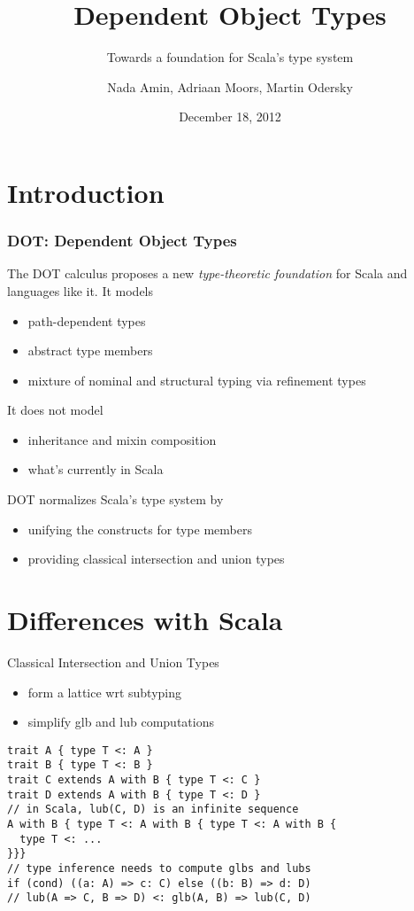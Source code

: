 \documentclass{beamer}
\title{Dependent Object Types}
\subtitle{Towards a foundation for Scala's type system}
\author{Nada Amin, Adriaan Moors, Martin Odersky}
\institute{Foundations of Software}
\date{December 18, 2012}
\begin{document}
\frame{\titlepage}

\section{Introduction}

\begin{frame}
\frametitle{DOT: Dependent Object Types}

The DOT calculus proposes a new \emph{type-theoretic foundation} for Scala
and languages like it. It models
\begin{itemize}
\item path-dependent types
\item abstract type members
\item mixture of nominal and structural typing via refinement types
\end{itemize}

It does not model
\begin{itemize}
\item inheritance and mixin composition
\item what's currently in Scala
\end{itemize}

DOT normalizes Scala's type system by
\begin{itemize}
\item unifying the constructs for type members
\item providing classical intersection and union types
\end{itemize}

\end{frame}

\section{Differences with Scala}

\begin{frame}[fragile]{Classical Intersection and Union Types}
\begin{itemize}
\item form a lattice wrt subtyping
\item simplify glb and lub computations
\end{itemize}
\begin{verbatim}
trait A { type T <: A }
trait B { type T <: B }
trait C extends A with B { type T <: C }
trait D extends A with B { type T <: D }
// in Scala, lub(C, D) is an infinite sequence
A with B { type T <: A with B { type T <: A with B {
  type T <: ...
}}}
// type inference needs to compute glbs and lubs
if (cond) ((a: A) => c: C) else ((b: B) => d: D)
// lub(A => C, B => D) <: glb(A, B) => lub(C, D)
\end{verbatim}
\end{frame}
\end{document}
